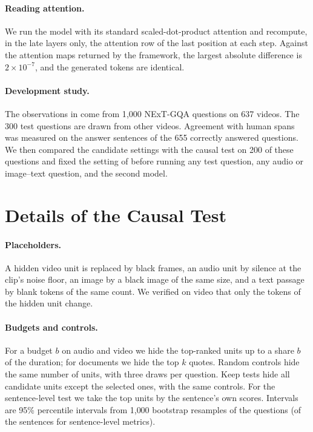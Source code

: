 \paragraph{Reading attention.}
We run the model with its standard scaled-dot-product attention and recompute, in the late layers only, the attention row of the last position at each step. Against the attention maps returned by the framework, the largest absolute difference is $2\times10^{-7}$, and the generated tokens are identical.

\paragraph{Development study.}
The observations in  come from 1{,}000 NExT-GQA questions on 637 videos. The 300 test questions are drawn from other videos.
Agreement with human spans was measured on the answer sentences of the 655 correctly answered questions.
We then compared the candidate settings with the causal test on 200 of these questions and fixed the setting of  before running any test question, any audio or image--text question, and the second model.

\section{Details of the Causal Test}
\label{appendix:causal}

\paragraph{Placeholders.}
A hidden video unit is replaced by black frames, an audio unit by silence at the clip's noise floor, an image by a black image of the same size, and a text passage by blank tokens of the same count. We verified on video that only the tokens of the hidden unit change.

\paragraph{Budgets and controls.}
For a budget $b$ on audio and video we hide the top-ranked units up to a share $b$ of the duration; for documents we hide the top $k$ quotes. Random controls hide the same number of units, with three draws per question. Keep tests hide all candidate units except the selected ones, with the same controls.
For the sentence-level test we take the top units by the sentence's own scores.
Intervals are 95\% percentile intervals from 1{,}000 bootstrap resamples of the questions (of the sentences for sentence-level metrics).

